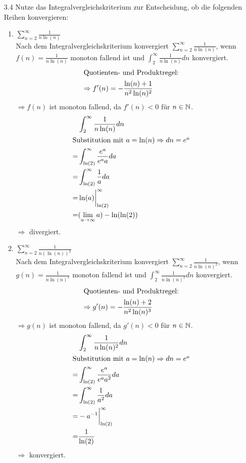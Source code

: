 \documentclass{HM}
\begin{document}
\begin{enumerate}
		\item[3.4] Nutze das Integralvergleichskriterium zur Entscheidung, ob die folgenden Reihen konvergieren:
		\begin{enumerate}
			\item $\sum\limits_{n=2}^\infty\frac{1}{n\ln(n)}$\\
			Nach dem Integralvergleichskriterium konvergiert $\sum\limits_{n=2}^\infty\frac{1}{n\ln(n)}$, wenn $f(n)=\frac{1}{n\ln(n)}$ monoton fallend ist und $\int_2^\infty\frac{1}{n\ln(n)}dn$ konvergiert.
			\begin{align*}
				\intertext{Quotienten- und Produktregel:}
				\Rightarrow f'(n)=-\frac{\ln(n)+1}{n^2\ln(n)^2}
			\end{align*}
			$\Rightarrow f(n)$ ist monoton fallend, da $f'(n)<0$ für $n\in\mathbb{N}$.
			\begin{align*}
				&\int_2^\infty\frac{1}{n\ln(n)}dn\\
				\intertext{Substitution mit $a=\ln(n)\Rightarrow dn=e^a$}
				=&\int_{\ln(2)}^\infty\frac{e^a}{e^aa}da\\
				=&\int_{\ln(2)}^\infty\frac{1}{a}da\\
				=&\ln(a)\biggr|_{\ln(2)}^\infty\\
				=&(\lim_{a\to\infty}a)-\ln(\ln(2))
			\end{align*}
			$\Rightarrow$ divergiert.
			
			\item $\sum\limits_{n=2}^\infty\frac{1}{n(\ln(n))^2}$\\
			Nach dem Integralvergleichskriterium konvergiert $\sum\limits_{n=2}^\infty\frac{1}{n\ln(n)^2}$, wenn $g(n)=\frac{1}{n\ln(n)^2}$ monoton fallend ist und $\int_2^\infty\frac{1}{n\ln(n)^2}dn$ konvergiert.
			\begin{align*}
				\intertext{Quotienten- und Produktregel:}
				\Rightarrow g'(n)=-\frac{\ln(n)+2}{n^2\ln(n)^3}
			\end{align*}
			$\Rightarrow g(n)$ ist monoton fallend, da $g'(n)<0$ für $n\in\mathbb{N}$.
			\begin{align*}
				&\int_2^\infty\frac{1}{n\ln(n)^2}dn\\
				\intertext{Substitution mit $a=\ln(n)\Rightarrow dn=e^a$}
				=&\int_{\ln(2)}^\infty\frac{e^a}{e^aa^2}da\\
				=&\int_{\ln(2)}^\infty\frac{1}{a^2}da\\
				=&-a^{-1}\biggr|_{\ln(2)}^\infty\\
				=&\frac{1}{\ln(2)}
			\end{align*}
			$\Rightarrow$ konvergiert.
		\end{enumerate}
		

\end{enumerate}
\end{document}
